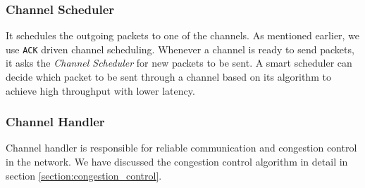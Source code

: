 \subsubsection{Channel Scheduler}
It schedules the outgoing packets to one of the channels. As mentioned earlier, we use \texttt{ACK} driven channel scheduling. Whenever a channel is ready to send packets, it asks the {\em Channel Scheduler} for new packets to be sent. A smart scheduler can decide which packet to be sent through a channel based on its algorithm to achieve high throughput with lower latency.


\subsubsection{Channel Handler}
Channel handler is responsible for reliable communication and congestion control in the network. We have discussed the congestion control algorithm in detail in section \ref{section:congestion_control}.


